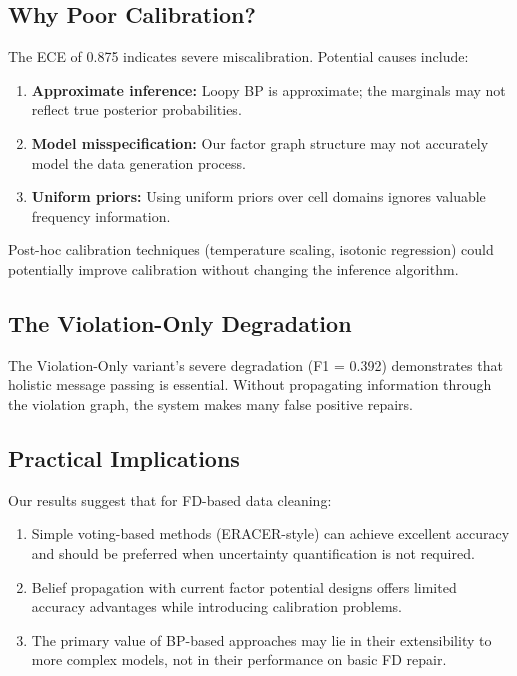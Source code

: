 \documentclass{article}
\begin{document}
\subsection{Why Poor Calibration?}

The ECE of 0.875 indicates severe miscalibration. Potential causes include:

\begin{enumerate}
    \item \textbf{Approximate inference:} Loopy BP is approximate; the marginals may not reflect true posterior probabilities.
    
    \item \textbf{Model misspecification:} Our factor graph structure may not accurately model the data generation process.
    
    \item \textbf{Uniform priors:} Using uniform priors over cell domains ignores valuable frequency information.
\end{enumerate}

Post-hoc calibration techniques (temperature scaling, isotonic regression) could potentially improve calibration without changing the inference algorithm.

\subsection{The Violation-Only Degradation}

The Violation-Only variant's severe degradation (F1 = 0.392) demonstrates that holistic message passing is essential. Without propagating information through the violation graph, the system makes many false positive repairs.

\subsection{Practical Implications}

Our results suggest that for FD-based data cleaning:
\begin{enumerate}
    \item Simple voting-based methods (ERACER-style) can achieve excellent accuracy and should be preferred when uncertainty quantification is not required.
    
    \item Belief propagation with current factor potential designs offers limited accuracy advantages while introducing calibration problems.
    
    \item The primary value of BP-based approaches may lie in their extensibility to more complex models, not in their performance on basic FD repair.
\end{enumerate}
\end{document}
